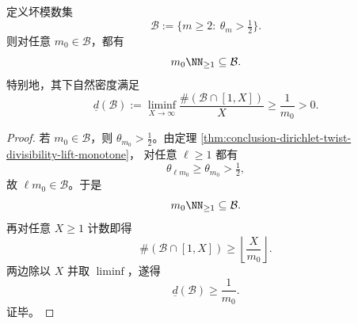 \begin{corollary}[仅由整除传播便可推出坏模数集的正下密度]\label{cor:conclusion-dirichlet-bad-moduli-positive-lower-density-by-divisibility}
定义坏模数集
\[
\mathcal B:=\{m\ge 2:\ \theta_m>\tfrac12\}.
\]
则对任意 \(m_0\in\mathcal B\)，都有
\[
m_0\NN_{\ge 1}\subseteq \mathcal B.
\]
特别地，其下自然密度满足
\[
\underline d(\mathcal B)
:=
\liminf_{X\to\infty}\frac{\#(\mathcal B\cap [1,X])}{X}
\ge
\frac{1}{m_0}
>
0.
\]
\end{corollary}
\begin{proof}
若 \(m_0\in\mathcal B\)，则 \(\theta_{m_0}>\tfrac12\)。由定理 \ref{thm:conclusion-dirichlet-twist-divisibility-lift-monotone}，
对任意 \(\ell\ge 1\) 都有
\[
\theta_{\ell m_0}\ge \theta_{m_0}>\tfrac12,
\]
故 \(\ell m_0\in\mathcal B\)。于是
\[
m_0\NN_{\ge 1}\subseteq \mathcal B.
\]
再对任意 \(X\ge 1\) 计数即得
\[
\#(\mathcal B\cap [1,X])
\ge
\left\lfloor \frac{X}{m_0}\right\rfloor.
\]
两边除以 \(X\) 并取 \(\liminf\)，遂得
\[
\underline d(\mathcal B)\ge \frac{1}{m_0}.
\]
证毕。
\end{proof}

